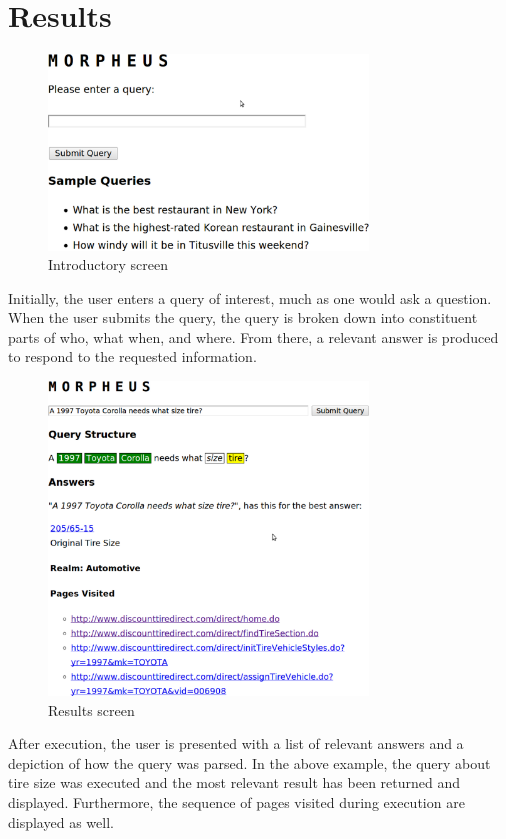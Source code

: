 \section{Results}

\begin{figure}[t]
\centering
\includegraphics[width=85mm]{screen_intro.eps}
\caption{Introductory screen}
\label{fig:screen_intro}
\end{figure}

Initially, the user enters a query of interest, much as one would ask a question. When the user submits the query, the query is broken down into constituent parts of who, what when, and where. From there, a relevant answer is produced to respond to the requested information.

\begin{figure}[t]
\centering
\includegraphics[width=85mm]{screen_result.eps}
\caption{Results screen}
\label{fig:screen_result}
\end{figure}


After execution, the user is presented with a list of relevant answers and a depiction of how the query was parsed. In the above example, the query about tire size was executed and the most relevant result has been returned and displayed. 
Furthermore, the sequence of pages visited during execution are displayed as well. 




